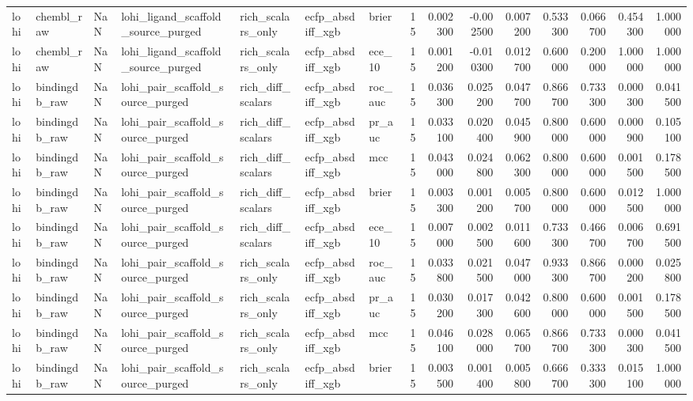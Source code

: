 \begin{longtable}{lllllllrrrrrrrr}
lohi & chembl\_raw & NaN & lohi\_ligand\_scaffold\_source\_purged & rich\_scalars\_only & ecfp\_absdiff\_xgb & brier & 15 & 0.002300 & -0.002500 & 0.007200 & 0.533300 & 0.066700 & 0.454300 & 1.000000 \\
lohi & chembl\_raw & NaN & lohi\_ligand\_scaffold\_source\_purged & rich\_scalars\_only & ecfp\_absdiff\_xgb & ece\_10 & 15 & 0.001200 & -0.010300 & 0.012700 & 0.600000 & 0.200000 & 1.000000 & 1.000000 \\
lohi & bindingdb\_raw & NaN & lohi\_pair\_scaffold\_source\_purged & rich\_diff\_scalars & ecfp\_absdiff\_xgb & roc\_auc & 15 & 0.036300 & 0.025200 & 0.047700 & 0.866700 & 0.733300 & 0.000300 & 0.041500 \\
lohi & bindingdb\_raw & NaN & lohi\_pair\_scaffold\_source\_purged & rich\_diff\_scalars & ecfp\_absdiff\_xgb & pr\_auc & 15 & 0.033100 & 0.020400 & 0.045900 & 0.800000 & 0.600000 & 0.000900 & 0.105100 \\
lohi & bindingdb\_raw & NaN & lohi\_pair\_scaffold\_source\_purged & rich\_diff\_scalars & ecfp\_absdiff\_xgb & mcc & 15 & 0.043000 & 0.024800 & 0.062300 & 0.800000 & 0.600000 & 0.001500 & 0.178500 \\
lohi & bindingdb\_raw & NaN & lohi\_pair\_scaffold\_source\_purged & rich\_diff\_scalars & ecfp\_absdiff\_xgb & brier & 15 & 0.003300 & 0.001200 & 0.005700 & 0.800000 & 0.600000 & 0.012500 & 1.000000 \\
lohi & bindingdb\_raw & NaN & lohi\_pair\_scaffold\_source\_purged & rich\_diff\_scalars & ecfp\_absdiff\_xgb & ece\_10 & 15 & 0.007000 & 0.002500 & 0.011600 & 0.733300 & 0.466700 & 0.006700 & 0.691500 \\
lohi & bindingdb\_raw & NaN & lohi\_pair\_scaffold\_source\_purged & rich\_scalars\_only & ecfp\_absdiff\_xgb & roc\_auc & 15 & 0.033800 & 0.021500 & 0.047000 & 0.933300 & 0.866700 & 0.000200 & 0.025800 \\
lohi & bindingdb\_raw & NaN & lohi\_pair\_scaffold\_source\_purged & rich\_scalars\_only & ecfp\_absdiff\_xgb & pr\_auc & 15 & 0.030200 & 0.017300 & 0.042600 & 0.800000 & 0.600000 & 0.001500 & 0.178500 \\
lohi & bindingdb\_raw & NaN & lohi\_pair\_scaffold\_source\_purged & rich\_scalars\_only & ecfp\_absdiff\_xgb & mcc & 15 & 0.046100 & 0.028000 & 0.065700 & 0.866700 & 0.733300 & 0.000300 & 0.041500 \\
lohi & bindingdb\_raw & NaN & lohi\_pair\_scaffold\_source\_purged & rich\_scalars\_only & ecfp\_absdiff\_xgb & brier & 15 & 0.003500 & 0.001400 & 0.005800 & 0.666700 & 0.333300 & 0.015100 & 1.000000 \\

\end{longtable}
